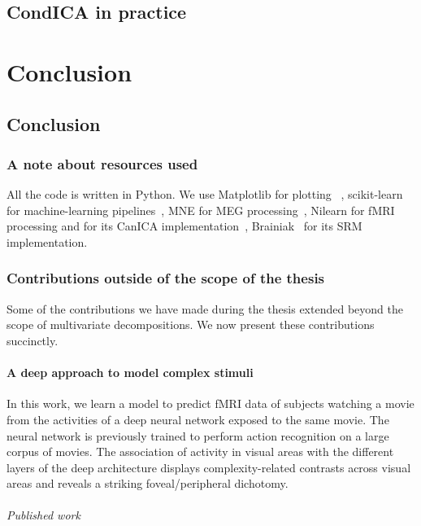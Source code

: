 \documentclass[ twoside,openright,titlepage,numbers=noenddot,%
                headinclude,footinclude,cleardoublepage=empty,abstract=on,
                BCOR=5mm,paper=a4,fontsize=11pt, 
                ]{scrreprt}
\begin{document}
\chapter{CondICA in practice}
\label{ch:condica2}


\part{Conclusion}

\chapter{Conclusion}
\section{A note about resources used}
All the code is written in Python.
We use Matplotlib for plotting~\cite{hunter2007matplotlib} , scikit-learn for
machine-learning pipelines~\cite{pedregosa2011scikit}, MNE for MEG
processing~\cite{gramfort2013meg}, Nilearn for fMRI processing and for its CanICA implementation~\cite{abraham2014machine}, Brainiak~\cite{kumar2020brainiak} for its SRM implementation. 


\section{Contributions outside of the scope of the thesis}
Some of the contributions we have made during the thesis extended beyond the scope of multivariate decompositions. We now present these contributions succinctly.

\subsection{A deep approach to model complex stimuli}
In this work, we learn a model to predict fMRI data of subjects watching a movie
from the activities of a deep neural network exposed to the same movie. The neural network is previously trained to perform action recognition on a large corpus of movies.
The association of activity in visual areas with the different layers of the
deep architecture displays complexity-related contrasts across visual areas and
reveals a striking foveal/peripheral dichotomy.

\paragraph{Published work}
\end{document}
